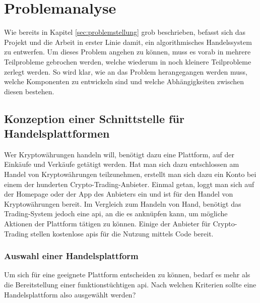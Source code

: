 \documentclass[oneside]{ausarbeitung}
\begin{document}

\chapter{Problemanalyse}
\label{cha:problemanalyse}

Wie bereits in Kapitel \ref{sec:problemstellung} grob beschrieben,
befasst sich das Projekt und die Arbeit in erster Linie damit, ein
algorithmisches Handelssystem zu entwerfen. Um dieses Problem angehen
zu können, muss es vorab in mehrere Teilprobleme gebrochen werden,
welche wiederum in noch kleinere Teilprobleme zerlegt werden. So wird
klar, wie an das Problem herangegangen werden muss, welche Komponenten
zu entwickeln sind und welche Abhängigkeiten zwischen diesen
bestehen.


\section{Konzeption einer Schnittstelle für Handelsplattformen}
\label{sec:schnittstelle_handelsplatform}

Wer Kryptowährungen handeln will, benötigt dazu eine Plattform, auf
der Einkäufe und Verkäufe getätigt werden. Hat man sich dazu
entschlossen am Handel von Kryptowährungen teilzunehmen, erstellt man
sich dazu ein Konto bei einem der hunderten Crypto-Trading-Anbieter.
Einmal getan, loggt man sich auf der Homepage oder der App des
Anbieters ein und ist für den Handel von Kryptowährungen bereit. Im
Vergleich zum Handeln von Hand, benötigt das Trading-System jedoch
eine \ac{api}, an die es anknüpfen kann, um mögliche Aktionen der
Plattform tätigen zu können. Einige der Anbieter für Crypto-Trading
stellen kostenlose \ac{api}s für die Nutzung mittels Code bereit.

\subsection{Auswahl einer Handelsplattform}
\label{sub:auswahl_plattform}

Um sich für eine geeignete Plattform entscheiden zu können, bedarf
es mehr als die Bereitstellung einer funktionstüchtigen \ac{api}.
Nach welchen Kriterien sollte eine Handelsplattform also ausgewählt
werden? \\
\end{document}
